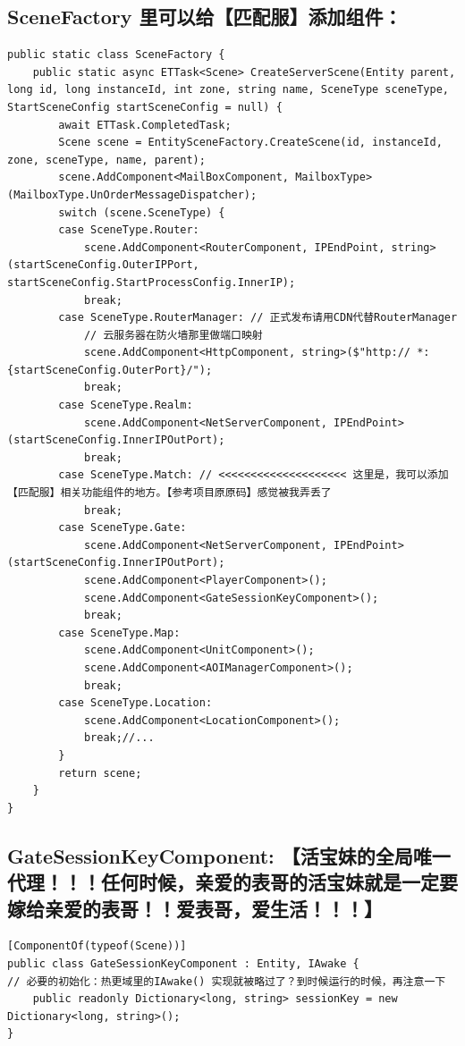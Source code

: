 \documentclass[9pt, b5paper]{article}
\begin{document}
\subsection{SceneFactory 里可以给【匹配服】添加组件：}
\label{sec:org73183f3}
\begin{verbatim}
public static class SceneFactory {
    public static async ETTask<Scene> CreateServerScene(Entity parent, long id, long instanceId, int zone, string name, SceneType sceneType, StartSceneConfig startSceneConfig = null) {
        await ETTask.CompletedTask;
        Scene scene = EntitySceneFactory.CreateScene(id, instanceId, zone, sceneType, name, parent);
        scene.AddComponent<MailBoxComponent, MailboxType>(MailboxType.UnOrderMessageDispatcher);
        switch (scene.SceneType) {
        case SceneType.Router:
            scene.AddComponent<RouterComponent, IPEndPoint, string>(startSceneConfig.OuterIPPort, startSceneConfig.StartProcessConfig.InnerIP);
            break;
        case SceneType.RouterManager: // 正式发布请用CDN代替RouterManager
            // 云服务器在防火墙那里做端口映射
            scene.AddComponent<HttpComponent, string>($"http:// *:{startSceneConfig.OuterPort}/");
            break;
        case SceneType.Realm:
            scene.AddComponent<NetServerComponent, IPEndPoint>(startSceneConfig.InnerIPOutPort);
            break;
        case SceneType.Match: // <<<<<<<<<<<<<<<<<<<< 这里是，我可以添加【匹配服】相关功能组件的地方。【参考项目原原码】感觉被我弄丢了
            break;
        case SceneType.Gate:
            scene.AddComponent<NetServerComponent, IPEndPoint>(startSceneConfig.InnerIPOutPort);
            scene.AddComponent<PlayerComponent>();
            scene.AddComponent<GateSessionKeyComponent>();
            break;
        case SceneType.Map:
            scene.AddComponent<UnitComponent>();
            scene.AddComponent<AOIManagerComponent>();
            break;
        case SceneType.Location:
            scene.AddComponent<LocationComponent>();
            break;//...
        }
        return scene;
    }
}
\end{verbatim}
\subsection{GateSessionKeyComponent: 【活宝妹的全局唯一代理！！！任何时候，亲爱的表哥的活宝妹就是一定要嫁给亲爱的表哥！！爱表哥，爱生活！！！】}
\label{sec:org2735a59}
\begin{verbatim}
[ComponentOf(typeof(Scene))]
public class GateSessionKeyComponent : Entity, IAwake {
// 必要的初始化：热更域里的IAwake() 实现就被略过了？到时候运行的时候，再注意一下
    public readonly Dictionary<long, string> sessionKey = new Dictionary<long, string>(); 
}
\end{verbatim}
\end{document}
